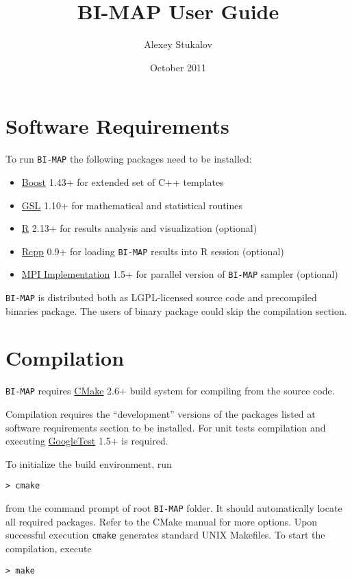 \documentclass[microtype,a4paper,article,10pt,oneside,final]{memoir}
\title{BI-MAP User Guide}
\author{Alexey Stukalov}
\date{October 2011}
\newcommand{\bimap}{\texttt{BI-MAP}\xspace}
\begin{document}
\maketitle

\setcounter{tocdepth}{3}
\tableofcontents
\vspace*{1cm}

\section{Software Requirements}

To run \bimap the following packages need to be installed:
\begin{itemize}
  \item \href{http://www.boost.org}{Boost} 1.43+ for extended set of C++ templates
  \item \href{http://www.gnu.org/s/gsl/}{GSL} 1.10+ for mathematical and statistical routines
  \item \href{http://r-project.org}{R} 2.13+ for results analysis and visualization (optional)
  \item \href{http://dirk.eddelbuettel.com/code/rcpp.html}{Rcpp} 0.9+ for loading \bimap results into R session (optional)
  \item \href{http://www.open-mpi.org/}{MPI Implementation} 1.5+ for parallel version of \bimap sampler (optional)
\end{itemize}

\bimap is distributed both as LGPL-licensed source code and precompiled binaries package.
The users of binary package could skip the compilation section.

\section{Compilation}

\bimap requires \href{http://www.cmake.org}{CMake} 2.6+ build system for compiling from the source code.

Compilation requires the ``development'' versions of the packages listed at software requirements section to be installed.
For unit tests compilation and executing \href{http://code.google.com/p/googletest/}{GoogleTest} 1.5+ is required.

To initialize the build environment, run
\begin{verbatim}
> cmake
\end{verbatim}
from the command prompt of root \bimap folder.
It should automatically locate all required packages.
Refer to the CMake manual for more options.
Upon successful execution \texttt{cmake} generates standard UNIX Makefiles.
To start the compilation, execute
\begin{verbatim}
> make
\end{verbatim}
\end{document}
